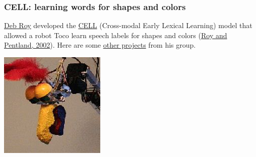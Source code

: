 \documentclass[ignorenonframetext]{beamer}
\begin{document}
\begin{frame}\frametitle{CELL: learning words for shapes and colors}
\href{http://dkroy.media.mit.edu/}{Deb Roy} developed the
\href{http://www.media.mit.edu/cogmac/projects/wdlearning.html}{CELL}
(Cross-modal Early Lexical Learning) model that allowed a robot Toco
learn speech labels for shapes and colors (\href{http://onlinelibrary.wiley.com/doi/10.1207/s15516709cog2601_4/pdf}{Roy and Pentland, 2002}).  Here are some
\href{http://www.media.mit.edu/cogmac/projects.html}{other projects}
from his group.
\vspace{1em}
\begin{center}
\href{http://www.media.mit.edu/cogmac/projects/wdlearning.html}{
\includegraphics[height=.5\textheight]{images/toco_large.jpg}
}
\end{center}
\end{frame}
\end{document}
